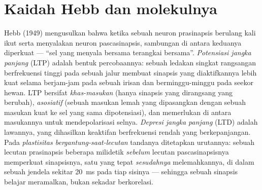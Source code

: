 \section{Kaidah Hebb dan molekulnya}

\begin{definition}\label{def:b3:learning-memory:ltp}
%
Hebb (1949) mengusulkan bahwa ketika sebuah neuron prasinapsis berulang kali ikut
serta menyalakan neuron pascasinapsis, sambungan di antara keduanya
diperkuat --- ``sel yang menyala bersama terangkai bersama''.
\emph{Potensiasi jangka panjang} (LTP) adalah bentuk percobaannya: sebuah
ledakan singkat rangsangan berfrekuensi tinggi pada sebuah jalur membuat sinapsis
yang diaktifkannya lebih kuat selama berjam-jam pada sebuah irisan dan berminggu-minggu pada seekor
hewan. LTP bersifat \emph{khas-masukan} (hanya sinapsis yang dirangsang yang
berubah), \emph{asosiatif} (sebuah masukan lemah yang dipasangkan dengan sebuah masukan kuat ke
sel yang sama dipotensiasi), dan memerlukan \emph{} di antara
masukannya untuk mendepolarisasi selnya. \emph{Depresi jangka panjang} (LTD) adalah
lawannya, yang dihasilkan keaktifan berfrekuensi rendah yang berkepanjangan. Pada
\emph{plastisitas bergantung-saat-lecutan} tandanya ditetapkan urutannya: sebuah
lecutan prasinapsis beberapa milidetik \emph{sebelum} lecutan pascasinapsisnya
memperkuat sinapsisnya, satu yang tepat \emph{sesudahnya} melemahkannya, di dalam
sebuah jendela sekitar \qty{20}{ms} pada tiap sisinya --- sehingga sebuah sinapsis
belajar meramalkan, bukan sekadar berkorelasi.
\end{definition}

